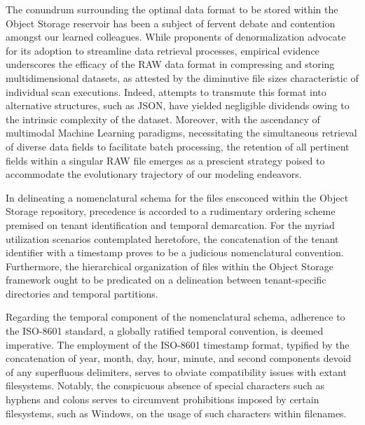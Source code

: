 The conundrum surrounding the optimal data format to be stored within the Object
Storage reservoir has been a subject of fervent debate and contention amongst
our learned colleagues. While proponents of denormalization advocate for its
adoption to streamline data retrieval processes, empirical evidence underscores
the efficacy of the RAW data format in compressing and storing multidimensional
datasets, as attested by the diminutive file sizes characteristic of individual
scan executions. Indeed, attempts to transmute this format into alternative
structures, such as JSON, have yielded negligible dividends owing to the
intrinsic complexity of the dataset. Moreover, with the ascendancy of multimodal
Machine Learning paradigms, necessitating the simultaneous retrieval of diverse
data fields to facilitate batch processing, the retention of all pertinent
fields within a singular RAW file emerges as a prescient strategy poised to
accommodate the evolutionary trajectory of our modeling endeavors.

In delineating a nomenclatural schema for the files ensconced within the Object
Storage repository, precedence is accorded to a rudimentary ordering scheme
premised on tenant identification and temporal demarcation. For the myriad
utilization scenarios contemplated heretofore, the concatenation of the tenant
identifier with a timestamp proves to be a judicious nomenclatural convention.
Furthermore, the hierarchical organization of files within the Object Storage
framework ought to be predicated on a delineation between tenant-specific
directories and temporal partitions.

Regarding the temporal component of the nomenclatural schema, adherence to the
ISO-8601 standard, a globally ratified temporal convention, is deemed
imperative. The employment of the ISO-8601 timestamp format, typified by the
concatenation of year, month, day, hour, minute, and second components devoid of
any superfluous delimiters, serves to obviate compatibility issues with extant
filesystems. Notably, the conspicuous absence of special characters such as
hyphens and colons serves to circumvent prohibitions imposed by certain
filesystems, such as Windows, on the usage of such characters within filenames.



